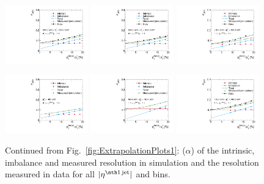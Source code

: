 \begin{figure}[ht]
    \includegraphics[width=0.32\textwidth]{figures/resolution/results/JER_for_2_eta_bin_9_pTGamma_bin_all_contributions_PFCHS_RMS99_mc.pdf}
    \includegraphics[width=0.32\textwidth]{figures/resolution/results/JER_for_2_eta_bin_10_pTGamma_bin_all_contributions_PFCHS_RMS99_mc.pdf}
    \includegraphics[width=0.32\textwidth]{figures/resolution/results/JER_for_2_eta_bin_11_pTGamma_bin_all_contributions_PFCHS_RMS99_mc.pdf}

    \includegraphics[width=0.32\textwidth]{figures/resolution/results/JER_for_2_eta_bin_12_pTGamma_bin_all_contributions_PFCHS_RMS99_mc.pdf}
    \includegraphics[width=0.32\textwidth]{figures/resolution/results/JER_for_3_eta_bin_4_pTGamma_bin_all_contributions_PFCHS_RMS99_mc.pdf}
    \includegraphics[width=0.32\textwidth]{figures/resolution/results/JER_for_3_eta_bin_5_pTGamma_bin_all_contributions_PFCHS_RMS99_mc.pdf}
  \caption{Continued from Fig.~\ref{fig:ExtrapolationPlots1}: \jer($\alpha$) of the intrinsic, imbalance and measured resolution in simulation and the resolution measured in data for all $|\etafirstjet|$ and \ptgamma bins.}
  \label{fig:ExtrapolationPlots2}
\end{figure}

